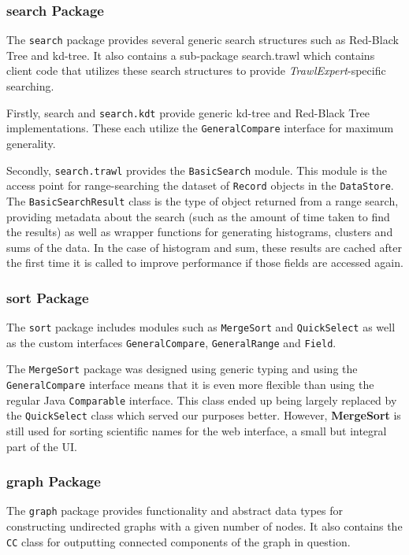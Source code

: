 \documentclass{article}
\begin{document}
\subsubsection{search Package}
The \texttt{search} package provides several generic search structures such as Red-Black Tree and kd-tree. It also contains a sub-package search.trawl which contains client code that utilizes these search structures to provide \textit{TrawlExpert}-specific searching.

Firstly, search and \texttt{search.kdt} provide generic kd-tree and Red-Black Tree implementations. These each utilize the \texttt{GeneralCompare} interface for maximum generality.

Secondly, \texttt{search.trawl} provides the \texttt{BasicSearch} module. This module is the access point for range-searching the dataset of \texttt{Record} objects in the \texttt{DataStore}. The \texttt{BasicSearchResult} class is the type of object returned from a range search, providing metadata about the search (such as the amount of time taken to find the results) as well as wrapper functions for generating histograms, clusters and sums of the data. In the case of histogram and sum, these results are cached after the first time it is called to improve performance if those fields are accessed again.

\subsubsection{sort Package}
The \texttt{sort} package includes modules such as \texttt{MergeSort} and \texttt{QuickSelect} as well as the custom interfaces \texttt{GeneralCompare}, \texttt{GeneralRange} and \texttt{Field}.

The \texttt{MergeSort} package was designed using generic typing and using the \texttt{GeneralCompare} interface means that it is even more flexible than using the regular Java \texttt{Comparable} interface. This class ended up being largely replaced by the \texttt{QuickSelect} class which served our purposes better. However, \textbf{MergeSort} is still used for sorting scientific names for the web interface, a small but integral part of the UI.

\subsubsection{graph Package}
The \texttt{graph} package provides functionality and abstract data types for constructing undirected graphs with a given number of nodes. It also contains the \texttt{CC} class for outputting connected components of the graph in question.
\end{document}
